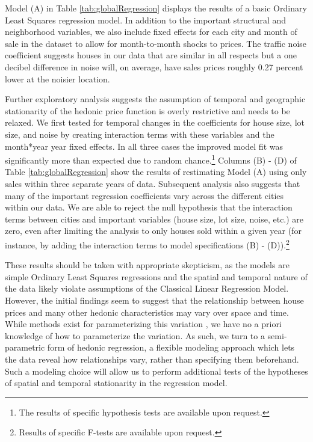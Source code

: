 \documentclass{article}\usepackage{graphicx, color}
\begin{document}
Model (A) in Table \ref{tab:globalRegression} displays the results of a basic Ordinary Least Squares regression model. In addition to the important structural and neighborhood variables, we also include fixed effects for each city and month of sale in the dataset to allow for month-to-month shocks to prices. The traffic noise coefficient suggests houses in our data that are similar in all respects but a one decibel difference in noise will, on average, have sales prices roughly 0.27 percent lower at the noisier location.  

Further exploratory analysis suggests the assumption of temporal and geographic stationarity of the hedonic price function is overly restrictive and needs to be relaxed. We first tested for temporal changes in the coefficients for house size, lot size, and noise by creating interaction terms with these variables and the month*year year fixed effects. In all three cases the improved model fit was significantly more than expected due to random chance.\footnote{The results of specific hypothesis tests are available upon request.} Columns (B) - (D) of Table \ref{tab:globalRegression} show the results of restimating Model (A) using only sales within three separate years of data. Subsequent analysis also suggests that many of the important regression coefficients vary across the different cities within our data. We are able to reject the null hypothesis that the interaction terms between cities and important variables (house size, lot size, noise, etc.) are zero, even after limiting the analysis to only houses sold within a given year (for instance, by adding the interaction terms to model specifications (B) - (D)).\footnote{Results of specific F-tests are available upon request.} 

These results should be taken with appropriate skepticism, as the models are simple Ordinary Least Squares regressions and the spatial and temporal nature of the data likely violate assumptions of the Classical Linear Regression Model. However, the initial findings seem to suggest that the relationship between house prices and many other hedonic characteristics may vary over space and time. While methods exist for parameterizing this variation \citep[such as spatial expansion as suggested by][]{Casetti1972}, we have no a priori knowledge of how to parameterize the variation. As such, we turn to a semi-parametric form of hedonic regression, a flexible modeling approach which lets the data reveal how relationships vary, rather than specifying them beforehand. Such a modeling choice will allow us to perform additional tests of the hypotheses of spatial and temporal stationarity in the regression model.
\end{document}
